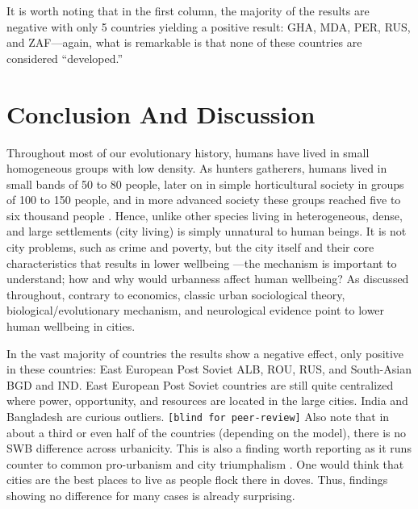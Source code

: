 \documentclass[10pt, letterpaper]{article}
\begin{document}
It is worth noting that in the first column, the majority of the results are
negative with only 5 countries yielding a positive result: GHA, MDA, PER, RUS, and ZAF---again, what is remarkable is that none of these countries are considered ``developed.''


\section*{Conclusion And Discussion}

Throughout most of our evolutionary history, humans have lived in small homogeneous groups with low density. As hunters gatherers, humans lived in small bands of 50 to 80 people, later on in simple horticultural society in groups of 100 to 150 people, and in more advanced society these groups reached five to six thousand people \citep{maryanski92}. Hence, unlike other species %
living in heterogeneous, dense, and large settlements (city living) is simply unnatural to human beings.  
%
It is not city problems, such as crime and poverty, but the city itself and their core characteristics that results in lower wellbeing \citep{aok_brfss_city_cize16}---the mechanism is important to understand; how and why would urbanness affect human wellbeing? 
As discussed throughout, contrary to economics, classic urban sociological theory, biological/evolutionary mechanism, and neurological evidence point to lower human wellbeing in cities.

In the vast majority of countries the results show a negative effect, only positive in these countries: East European Post Soviet ALB, ROU, RUS, and South-Asian BGD and IND.
East European Post Soviet countries are still quite centralized where power, opportunity, and resources are located in the large cities. %
India and Bangladesh are curious outliers. \texttt{[blind for
  peer-review]} %
%
Also note that in about a third or even half of the countries (depending on the
model), there is no SWB difference across urbanicity. This is also a finding
worth reporting as it runs counter to common pro-urbanism and city triumphalism
\citep[e.g.,][]{glaeser11}.
%
One would think that cities are the best places to live as people flock there in doves.
Thus, findings showing no difference for many cases is already surprising.
\end{document}
